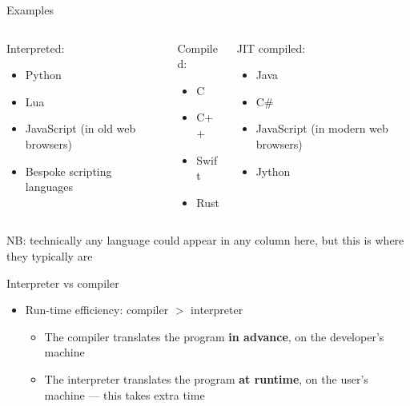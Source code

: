 \begin{frame}{Examples}
	\begin{columns}[t,onlytextwidth]
		\begin{column}{0.3\textwidth}
		    Interpreted:
		    \begin{itemize}
		        \item Python
		        \item Lua
						\item JavaScript (in old web browsers)
		        \item Bespoke scripting languages
		    \end{itemize}
		\end{column} \pause
		\begin{column}{0.3\textwidth}
		    Compiled:
		    \begin{itemize}
		        \item C
		        \item C++
		        \item Swift
		        \item Rust
		    \end{itemize}
		\end{column} \pause
		\begin{column}{0.3\textwidth}
		    JIT compiled:
		    \begin{itemize}
		        \item Java
		        \item C\#
		        \item JavaScript (in modern web browsers)
		        \item Jython
		    \end{itemize}
		\end{column}
	\end{columns}
	\vspace{1ex}
	\pause NB: technically any language could appear in any column here, but this is where they typically are
\end{frame}

\begin{frame}{Interpreter vs compiler}
    \begin{itemize}
        \item Run-time efficiency: compiler $>$ interpreter \pause
        \begin{itemize}
            \item The compiler translates the program \textbf{in advance}, on the developer's machine \pause
            \item The interpreter translates the program \textbf{at runtime}, on the user's machine --- this takes extra time
        \end{itemize}
    \end{itemize}
\end{frame}

